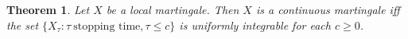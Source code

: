 \documentclass[12pt]{article}
\theoremstyle{definition}
\theoremstyle{plain}
\newtheorem{Lem}{Theorem}
\begin{document}
\begin{Lem}
Let $X$ be a local martingale. Then $X$ is a continuous martingale iff the set $\{X_{\tau} : \tau \ \text{stopping \ time}, \tau \leq c\}$ is uniformly integrable for each $c \geq 0$.
\end{Lem}



\end{document}
